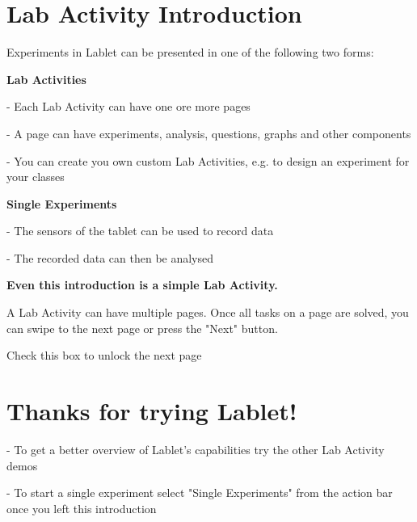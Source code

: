 \documentclass{article}
\begin{document}

\maketitle

\section{Lab Activity Introduction}
	Experiments in Lablet can be presented in one of the following two forms:

		\textbf{Lab Activities}

		- Each Lab Activity can have one ore more pages

		- A page can have experiments, analysis, questions, graphs and other components

		- You can create you own custom Lab Activities, e.g. to design an experiment for your classes

		\textbf{Single Experiments}

		- The sensors of the tablet can be used to record data

		- The recorded data can then be analysed

	\textbf{Even this introduction is a simple Lab Activity.}

	A Lab Activity can have multiple pages. Once all tasks on a page are solved, you can swipe to the next page or press the "Next" button.

	Check this box to unlock the next page

\section{Thanks for trying Lablet!}
	- To get a better overview of Lablet's capabilities try the other Lab Activity demos

	- To start a single experiment select "Single Experiments" from the action bar once you left this introduction
\end{document}
